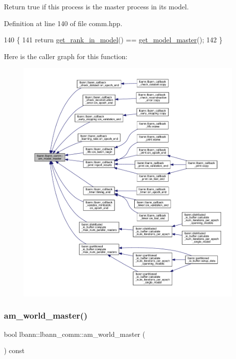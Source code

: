 Return true if this process is the master process in its model. 

Definition at line 140 of file comm.\+hpp.


\begin{DoxyCode}
140                                       \{
141     \textcolor{keywordflow}{return} \hyperlink{classlbann_1_1lbann__comm_a789453454468a3b70de768537c50ca52}{get\_rank\_in\_model}() == \hyperlink{classlbann_1_1lbann__comm_a96d8d7a0ff8ee1511f8c8b8fa92628af}{get\_model\_master}();
142   \}
\end{DoxyCode}
Here is the caller graph for this function\+:\nopagebreak
\begin{figure}[H]
\begin{center}
\leavevmode
\includegraphics[width=350pt]{classlbann_1_1lbann__comm_ad8a5790dfa9191d4b4f889e8707e57f1_icgraph}
\end{center}
\end{figure}
\mbox{\label{classlbann_1_1lbann__comm_a1ef526486183a29feadca9bef096a534}} 
\subsubsection{\texorpdfstring{am\+\_\+world\+\_\+master()}{am\_world\_master()}}
{\footnotesize\ttfamily bool lbann\+::lbann\+\_\+comm\+::am\+\_\+world\+\_\+master (\begin{DoxyParamCaption}{ }\end{DoxyParamCaption}) const\hspace{0.3cm}{\ttfamily [inline]}}

